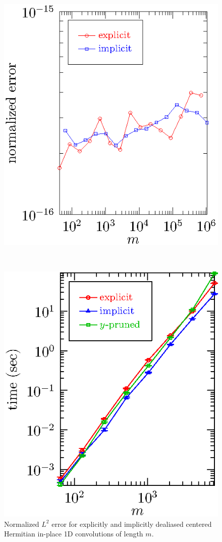 \documentclass[final]{siamltex}
\begin{document}
\begin{figure}[htbp]
\begin{minipage}{0.49\linewidth}
\begin{center}
\includegraphics{error1r}
\caption{Normalized $L^2$ error for explicitly and implicitly
dealiased centered Hermitian in-place 1D convolutions of length $m$.}
\label{error1r}
\end{center}
\end{minipage}
\,
\begin{minipage}{0.49\linewidth}
\begin{center}
\includegraphics{timing2c}

\end{center}
\end{minipage}
\end{figure}
\end{document}
